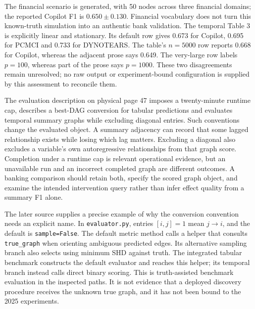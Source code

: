 The financial scenario is generated, with 50 nodes across three financial
domains; the reported Copilot F1 is $0.650\pm0.130$. Financial vocabulary does
not turn this known-truth simulation into an authentic bank validation. The
temporal Table 3 is explicitly linear and stationary. Its default row gives
0.673 for Copilot, 0.695 for PCMCI and 0.733 for DYNOTEARS. The table's
$n=5000$ row reports 0.668 for Copilot, whereas the adjacent prose says 0.649.
The very-large row labels $p=100$, whereas part of the prose says $p=1000$.
These two disagreements remain unresolved; no raw output or experiment-bound
configuration is supplied by this assessment to reconcile them.
\citep{exec17_copilot_paper}

The evaluation description on physical page 47 imposes a twenty-minute runtime
cap, describes a best-DAG conversion for tabular predictions and evaluates
temporal summary graphs while excluding diagonal entries. Such conventions
change the evaluated object. A summary adjacency can record that some lagged
relationship exists while losing which lag matters. Excluding a diagonal
also excludes a variable's own autoregressive relationships from that graph
score. Completion under a runtime cap is relevant operational evidence, but
an unavailable run and an incorrect completed graph are different outcomes.
A banking comparison should retain both, specify the scored graph object,
and examine the intended intervention query rather than infer effect quality
from a summary F1 alone.~\citep{exec17_copilot_paper}

The later source supplies a precise example of why the conversion convention
needs an explicit name. In \texttt{evaluator.py}, entries $[i,j]=1$ mean
$j\to i$, and the default is \texttt{sample=False}. The default metric method
calls a helper that consults \texttt{true\_graph} when orienting ambiguous
predicted edges. Its alternative sampling branch also selects using minimum
SHD against truth. The integrated tabular benchmark constructs the default
evaluator and reaches this helper; its temporal branch instead calls direct
binary scoring. This is truth-assisted benchmark evaluation in the inspected
paths. It is not evidence that a deployed discovery procedure receives the
unknown true graph, and it has not been bound to the 2025 experiments.
\citep{exec17_copilot_code}

